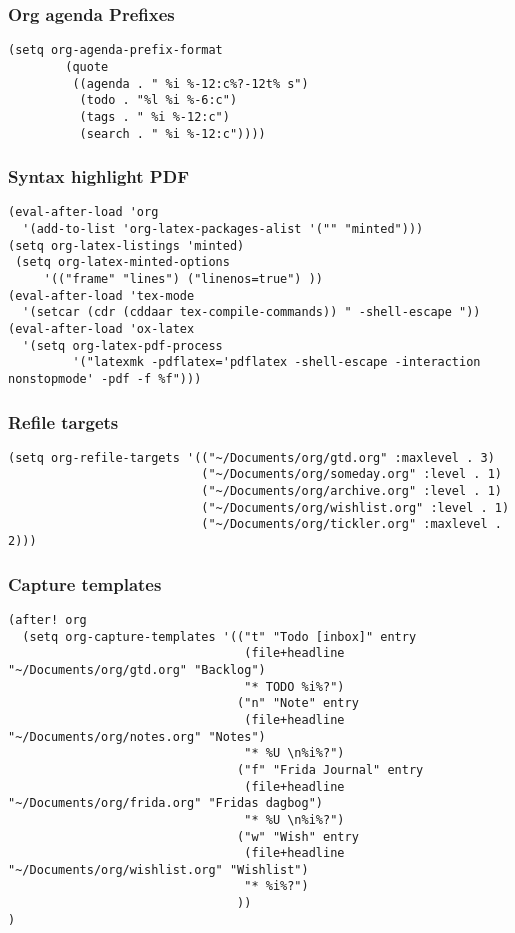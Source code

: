 \documentclass[11pt]{article}
\begin{document}
\subsubsection{Org agenda Prefixes}
\label{sec:org36706b2}
\begin{verbatim}
(setq org-agenda-prefix-format
        (quote
         ((agenda . " %i %-12:c%?-12t% s")
          (todo . "%l %i %-6:c")
          (tags . " %i %-12:c")
          (search . " %i %-12:c"))))
\end{verbatim}

\subsubsection{Syntax highlight PDF}
\label{sec:orgb48e41f}
\begin{verbatim}
(eval-after-load 'org
  '(add-to-list 'org-latex-packages-alist '("" "minted")))
(setq org-latex-listings 'minted)
 (setq org-latex-minted-options
     '(("frame" "lines") ("linenos=true") ))
(eval-after-load 'tex-mode
  '(setcar (cdr (cddaar tex-compile-commands)) " -shell-escape "))
(eval-after-load 'ox-latex
  '(setq org-latex-pdf-process
         '("latexmk -pdflatex='pdflatex -shell-escape -interaction nonstopmode' -pdf -f %f")))

\end{verbatim}
\subsubsection{Refile targets}
\label{sec:orgcbd583e}
\begin{verbatim}
(setq org-refile-targets '(("~/Documents/org/gtd.org" :maxlevel . 3)
                           ("~/Documents/org/someday.org" :level . 1)
                           ("~/Documents/org/archive.org" :level . 1)
                           ("~/Documents/org/wishlist.org" :level . 1)
                           ("~/Documents/org/tickler.org" :maxlevel . 2)))
\end{verbatim}
\subsubsection{Capture templates}
\label{sec:org987b3dd}
\begin{verbatim}
(after! org
  (setq org-capture-templates '(("t" "Todo [inbox]" entry
                                 (file+headline "~/Documents/org/gtd.org" "Backlog")
                                 "* TODO %i%?")
                                ("n" "Note" entry
                                 (file+headline "~/Documents/org/notes.org" "Notes")
                                 "* %U \n%i%?")
                                ("f" "Frida Journal" entry
                                 (file+headline "~/Documents/org/frida.org" "Fridas dagbog")
                                 "* %U \n%i%?")
                                ("w" "Wish" entry
                                 (file+headline "~/Documents/org/wishlist.org" "Wishlist")
                                 "* %i%?")
                                ))
)
\end{verbatim}
\end{document}
